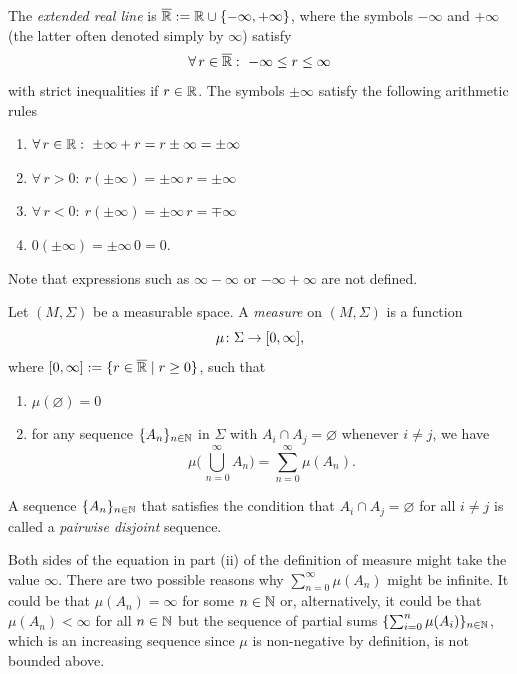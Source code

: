 \begin{definition}
The \emph{extended real line} is
$\overline{\mathbb{R}} := \mathbb{R} \cup \{-\infty,+\infty\}$, where the symbols
$-\infty$ and $+\infty$ (the latter often denoted simply by $\infty$)
satisfy
\begin{equation*}
\forall \, r \in \overline{\R} : \ -\infty\leq r \leq \infty
\end{equation*}
with strict inequalities if $r\in\mathbb{R}$.
The symbols $\pm\infty$ satisfy the following arithmetic rules
\begin{enumerate}[label=(\roman*)]
\item $\forall \, r\in \mathbb{R} : \ \pm \infty + r = r \pm \infty = \pm \infty$
\item $\forall \, r > 0 : \ r(\pm\infty)=\pm \infty\, r = \pm \infty$
\item $\forall \, r < 0 : \ r(\pm\infty)=\pm \infty\, r = \mp \infty$
\item $0(\pm\infty)=\pm \infty\, 0 = 0$.
\end{enumerate}
Note that expressions such as $\infty-\infty$ or $-\infty+\infty$ are not defined.
\end{definition}
\begin{definition}
Let $(M,\Sigma)$ be a measurable space. A \emph{measure} on $(M,\Sigma)$ is a function
\begin{equation*}
\mu\colon\Sigma\to[0,\infty],
\end{equation*}
where $[0,\infty]:=\{r\in\overline{\mathbb{R}}\mid r \geq 0\}$, such that
\begin{enumerate}[label=(\roman*)]
\item $\mu(\varnothing)=0$
\item for any sequence $\{A_n\}_{n\in \mathbb{N}}$ in $\Sigma$ with $A_i\cap A_j = \varnothing$ whenever $i\neq j$, we have
\begin{equation*}
\mu\biggl(\bigcup_{\,n=0}^{\infty}A_n\biggr) = \sum_{n=0}^{\infty}\mu(A_n).
\end{equation*}
\end{enumerate}
\end{definition}

A sequence $\{A_n\}_{n\in \mathbb{N}}$ that satisfies the condition that $A_i
\cap A_j = \varnothing$ for all $i \neq j$ is called a \emph{pairwise
disjoint} sequence.
\begin{remark}
Both sides of the equation in part (ii) of the definition of measure might take the value $\infty$. There are two possible reasons why $\sum_{n=0}^{\infty}\mu(A_n)$ might be infinite. It could be that $\mu(A_n) = \infty$ for some $n\in \mathbb{N}$ or, alternatively, it could be that $\mu(A_n) < \infty$ for all $n \in \mathbb{N}$ but the sequence of partial sums $\{ \sum_{i=0}^{n}\mu(A_i)\}_{n\in\mathbb{N}}$, which is an increasing sequence since $\mu$ is non-negative by definition, is not bounded above.
\end{remark}

